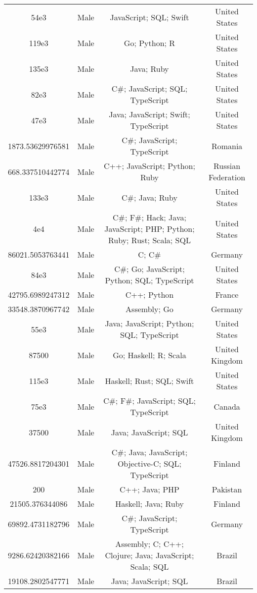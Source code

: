 \begin{center}
\begin{tabular}{ |c|c|c|c| }
54e3  &  Male  &  JavaScript; SQL; Swift  &  United States  \\ 
119e3  &  Male  &  Go; Python; R  &  United States  \\ 
135e3  &  Male  &  Java; Ruby  &  United States  \\ 
82e3  &  Male  &  C\#; JavaScript; SQL; TypeScript  &  United States  \\ 
47e3  &  Male  &  Java; JavaScript; Swift; TypeScript  &  United States  \\ 
1873.53629976581  &  Male  &  C\#; JavaScript; TypeScript  &  Romania  \\ 
668.337510442774  &  Male  &  C++; JavaScript; Python; Ruby  &  Russian Federation  \\ 
133e3  &  Male  &  C\#; Java; Ruby  &  United States  \\ 
4e4  &  Male  &  C\#; F\#; Hack; Java; JavaScript; PHP; Python; Ruby; Rust; Scala; SQL  &  United States  \\ 
86021.5053763441  &  Male  &  C; C\#  &  Germany  \\ 
84e3  &  Male  &  C\#; Go; JavaScript; Python; SQL; TypeScript  &  United States  \\ 
42795.6989247312  &  Male  &  C++; Python  &  France  \\ 
33548.3870967742  &  Male  &  Assembly; Go  &  Germany  \\ 
55e3  &  Male  &  Java; JavaScript; Python; SQL; TypeScript  &  United States  \\ 
87500  &  Male  &  Go; Haskell; R; Scala  &  United Kingdom  \\ 
115e3  &  Male  &  Haskell; Rust; SQL; Swift  &  United States  \\ 
75e3  &  Male  &  C\#; F\#; JavaScript; SQL; TypeScript  &  Canada  \\ 
37500  &  Male  &  Java; JavaScript; SQL  &  United Kingdom  \\ 
47526.8817204301  &  Male  &  C\#; Java; JavaScript; Objective-C; SQL; TypeScript  &  Finland  \\ 
200  &  Male  &  C++; Java; PHP  &  Pakistan  \\ 
21505.376344086  &  Male  &  Haskell; Java; Ruby  &  Finland  \\ 
69892.4731182796  &  Male  &  C\#; JavaScript; TypeScript  &  Germany  \\ 
9286.62420382166  &  Male  &  Assembly; C; C++; Clojure; Java; JavaScript; Scala; SQL  &  Brazil  \\ 
19108.2802547771  &  Male  &  Java; JavaScript; SQL  &  Brazil  \\ 

\end{tabular}
\end{center}
